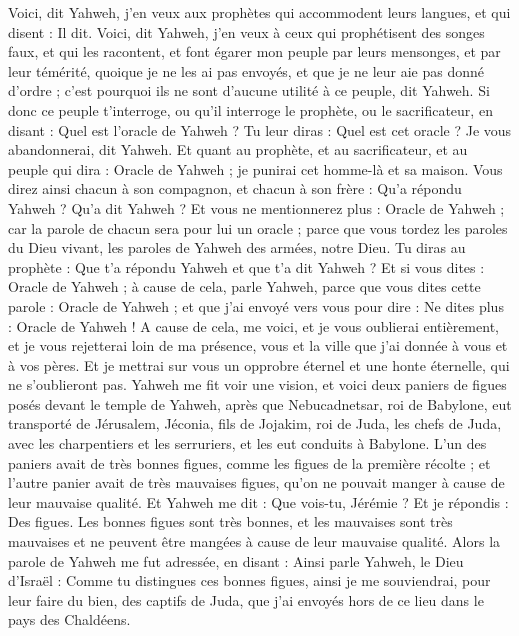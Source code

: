 \begin{multicols}{2}
Voici, dit Yahweh, j'en veux aux prophètes qui accommodent leurs langues, et qui disent : Il dit.
Voici, dit Yahweh, j'en veux à ceux qui prophétisent des songes faux, et qui les racontent, et font égarer mon peuple par leurs mensonges, et par leur témérité, quoique je ne les ai pas envoyés, et que je ne leur aie pas donné d'ordre ; c'est pourquoi ils ne sont d'aucune utilité à ce peuple, dit Yahweh.
Si donc ce peuple t'interroge, ou qu'il interroge le prophète, ou le sacrificateur, en disant : Quel est l'oracle de Yahweh ? Tu leur diras : Quel est cet oracle ? Je vous abandonnerai, dit Yahweh.
Et quant au prophète, et au sacrificateur, et au peuple qui dira : Oracle de Yahweh ; je punirai cet homme-là et sa maison.
Vous direz ainsi chacun à son compagnon, et chacun à son frère : Qu'a répondu Yahweh ? Qu'a dit Yahweh ?
Et vous ne mentionnerez plus : Oracle de Yahweh ; car la parole de chacun sera pour lui un oracle ; parce que vous tordez les paroles du Dieu vivant, les paroles de Yahweh des armées, notre Dieu.
Tu diras au prophète : Que t'a répondu Yahweh et que t'a dit Yahweh ?
Et si vous dites : Oracle de Yahweh ; à cause de cela, parle Yahweh, parce que vous dites cette parole : Oracle de Yahweh ; et que j'ai envoyé vers vous pour dire : Ne dites plus : Oracle de Yahweh !
A cause de cela, me voici, et je vous oublierai entièrement, et je vous rejetterai loin de ma présence, vous et la ville que j'ai donnée à vous et à vos pères.
Et je mettrai sur vous un opprobre éternel et une honte éternelle, qui ne s'oublieront pas.
\VerseOne{}Yahweh me fit voir une vision, et voici deux paniers de figues posés devant le temple de Yahweh, après que Nebucadnetsar, roi de Babylone, eut transporté de Jérusalem, Jéconia, fils de Jojakim, roi de Juda, les chefs de Juda, avec les charpentiers et les serruriers, et les eut conduits à Babylone.
L'un des paniers avait de très bonnes figues, comme les figues de la première récolte ; et l'autre panier avait de très mauvaises figues, qu'on ne pouvait manger à cause de leur mauvaise qualité.
Et Yahweh me dit : Que vois-tu, Jérémie ? Et je répondis : Des figues. Les bonnes figues sont très bonnes, et les mauvaises sont très mauvaises et ne peuvent être mangées à cause de leur mauvaise qualité.
Alors la parole de Yahweh me fut adressée, en disant :
Ainsi parle Yahweh, le Dieu d'Israël : Comme tu distingues ces bonnes figues, ainsi je me souviendrai, pour leur faire du bien, des captifs de Juda, que j'ai envoyés hors de ce lieu dans le pays des Chaldéens.

\end{multicols}
